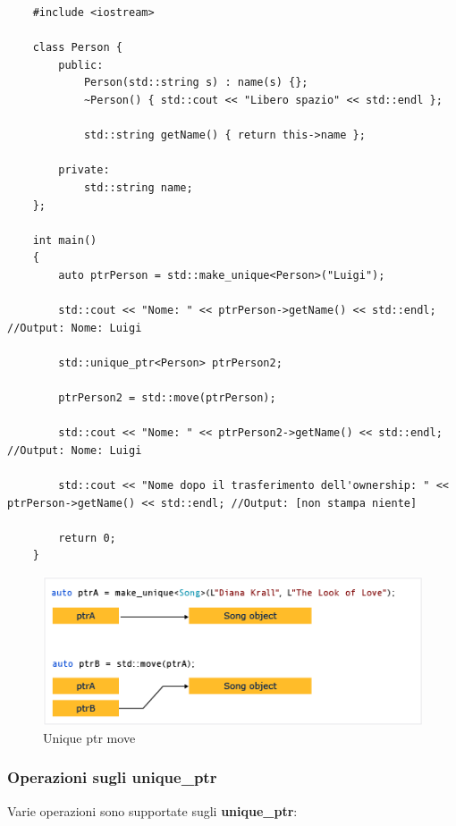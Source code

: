 \begin{lstlisting}
	#include <iostream>
	
	class Person {
		public:
			Person(std::string s) : name(s) {};
			~Person() { std::cout << "Libero spazio" << std::endl };
			
			std::string getName() { return this->name };
			
		private:
			std::string name;
	};

	int main()
	{
		auto ptrPerson = std::make_unique<Person>("Luigi");
		
		std::cout << "Nome: " << ptrPerson->getName() << std::endl; //Output: Nome: Luigi
		
		std::unique_ptr<Person> ptrPerson2;
		
		ptrPerson2 = std::move(ptrPerson);
		
		std::cout << "Nome: " << ptrPerson2->getName() << std::endl; //Output: Nome: Luigi
		
		std::cout << "Nome dopo il trasferimento dell'ownership: " << ptrPerson->getName() << std::endl; //Output: [non stampa niente]
		
		return 0;
	}
\end{lstlisting}

\begin{figure}[H]
	\centering
	\includegraphics[width=1\textwidth, height=1\textheight, keepaspectratio]{./imgs/unique_ptr_move2.png}
	\caption{Unique ptr move}
	\label{fig:unique_ptr_move2}
\end{figure}

\subsubsection{Operazioni sugli unique\_ptr}

\textsf{\small Varie operazioni sono supportate sugli \textbf{unique\_ptr}: } \\

